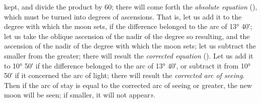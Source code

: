 \documentclass[11pt]{article}
\begin{document}
kept, and divide the product by 60; there will come forth the \emph{absolute equation} (), which must be turned into degrees of ascensions. That is, let us add it to the degree with which the moon sets, if the difference belonged to the arc of 13° 40′; let us take the oblique ascension of the nadir of the degree so resulting, and the ascension of the nadir of the degree with which the moon sets; let us subtract the smaller from the greater; there will result the \emph{corrected equation} (). Let us add it to 10° 50′ if the difference belonged to the arc of 13° 40′, or subtract it from 10° 50′ if it concerned the arc of light; there will result the \emph{corrected arc of seeing}. Then if the arc of stay is equal to the corrected arc of seeing or greater, the new moon will be seen; if smaller, it will not appear».\par
\end{document}
